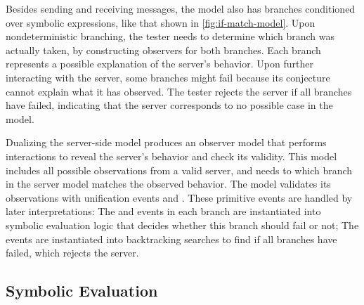 Besides sending and receiving messages, the model also has  branches
conditioned over symbolic expressions, like that shown in
\autoref{fig:if-match-model}.  Upon nondeterministic branching, the tester needs to
determine which branch was actually taken, by constructing observers for both
branches.  Each branch represents a possible explanation of the server's
behavior.  Upon further interacting with the server, some branches might fail
because its conjecture cannot explain what it has observed.  The tester rejects
the server if all branches have failed, indicating that the server corresponds
to no possible case in the model.

Dualizing the server-side model produces an observer model that performs
interactions to reveal the server's behavior and check its validity.  This model
includes all possible observations from a valid server, and needs to
 which branch in the server model matches the observed behavior.
The model validates its observations with unification events  and
.  These primitive events are handled by later interpretations: The
 and  events in each branch are instantiated into symbolic
evaluation logic that decides whether this branch should fail or not; The
 events are instantiated into backtracking searches to find if
all branches have failed, which rejects the server.


\subsection{Symbolic Evaluation}

